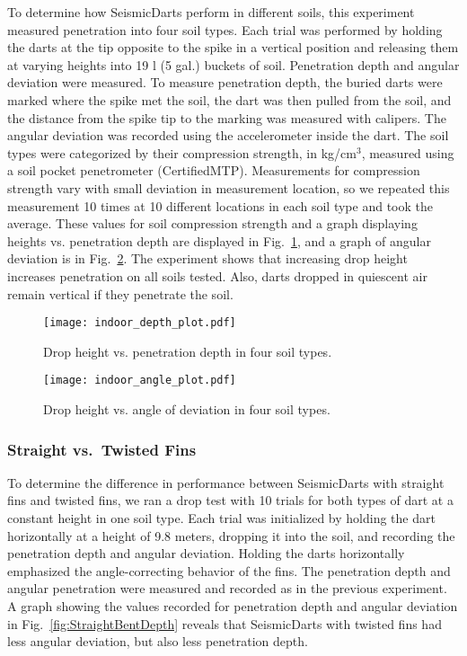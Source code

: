 To determine how SeismicDarts perform in different soils, this experiment measured penetration into four soil types. Each trial was performed by holding the darts at the tip opposite to the spike in a vertical position and releasing them at varying heights into 19 l (5 gal.) buckets of soil.
 Penetration depth and angular deviation were measured. To measure penetration depth, the buried darts were marked where the spike met the soil, the dart was then pulled from the soil, and the distance from the spike tip to the marking was measured with calipers. The angular deviation was recorded using the accelerometer inside the dart. The soil types were categorized by their compression strength, in kg/cm$^3$, measured using a soil pocket penetrometer (CertifiedMTP). Measurements for compression strength vary with small deviation in measurement location, so we repeated this measurement 10 times at 10 different locations in each soil type and took the average. These values for soil compression strength and a graph displaying heights vs. penetration depth are displayed in Fig.~\ref{fig:DepthPlotIndoors}, and a graph of angular deviation is in Fig.~\ref{fig:AnglePlotIndoors}. 
  The experiment shows that increasing drop height increases penetration on all soils tested.
  Also, darts dropped in quiescent air remain vertical if they penetrate the soil.


\begin{figure} \centering
{\texttt{[image: indoor\_depth\_plot.pdf]}}
\caption{Drop height vs. penetration depth in four soil types.} 
\label{fig:DepthPlotIndoors}
\end{figure}

\begin{figure} \centering
{\texttt{[image: indoor\_angle\_plot.pdf]}}
\caption{Drop height vs. angle of deviation in four soil types.} 
\label{fig:AnglePlotIndoors}
\vspace{-1em}
\end{figure}

\subsubsection{Straight vs.\ Twisted Fins}

To determine the difference in performance between SeismicDarts with straight fins and twisted fins, we ran a drop test with 10 trials for both types of dart at a constant height in one soil type. Each trial was initialized by holding the dart horizontally at a height of 9.8 meters, dropping it into the soil, and recording the penetration depth and angular deviation. Holding the darts horizontally emphasized the angle-correcting behavior of the fins. The penetration depth and angular penetration were measured and recorded as in the previous experiment. A graph showing the values recorded for penetration depth and angular deviation in Fig.~\ref{fig:StraightBentDepth}  reveals that SeismicDarts with twisted fins had less angular deviation, but also less penetration depth. 

